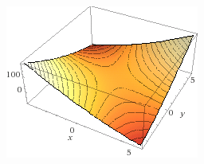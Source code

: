 \documentclass[12pt]{article}%
\begin{document}
\begin{enumerate}[(a)]
            \begin{center}
                \includegraphics[scale=.75]{graph}
            \end{center}
    \end{enumerate}
\end{document}
